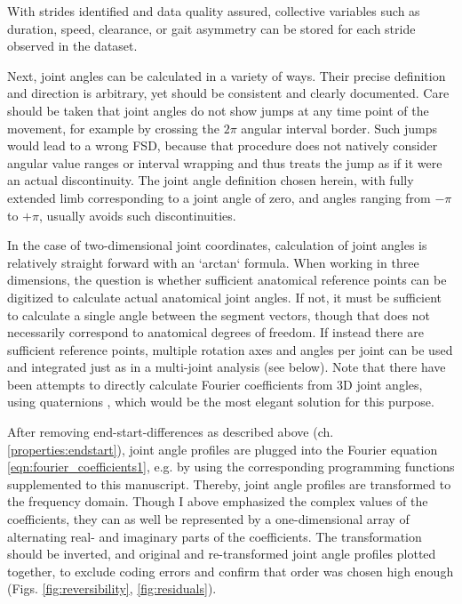 With strides identified and data quality assured, collective variables such as duration, speed, clearance, or gait asymmetry can be stored for each stride observed in the dataset.


Next, joint angles can be calculated in a variety of ways.
Their precise definition and direction is arbitrary, yet should be consistent and clearly documented.
Care should be taken that joint angles do not show jumps at any time point of the movement, for example by crossing the \(2\pi\) angular interval border.
Such jumps would lead to a wrong FSD, because that procedure does not natively consider angular value ranges or interval wrapping and thus treats the jump as if it were an actual discontinuity.
The joint angle definition chosen herein, with fully extended limb corresponding to a joint angle of zero, and angles ranging from \(-\pi\) to \(+\pi\), usually avoids such discontinuities.

In the case of two-dimensional joint coordinates, calculation of joint angles is relatively straight forward with an `arctan` formula.
When working in three dimensions, the question is whether sufficient anatomical reference points can be digitized to calculate actual anatomical joint angles.
If not, it must be sufficient to calculate a single angle between the segment vectors, though that does not necessarily correspond to anatomical degrees of freedom.
If instead there are sufficient reference points, multiple rotation axes and angles per joint can be used and integrated just as in a multi-joint analysis (see below).
Note that there have been attempts to directly calculate Fourier coefficients from 3D joint angles, using quaternions \citep{Kenwright2015}, which would be the most elegant solution for this purpose.


After removing end-start-differences as described above (ch. \ref{properties:endstart}), joint angle profiles are plugged into the Fourier equation \eqref{eqn:fourier_coefficients1}, e.g. by using the corresponding programming functions supplemented to this manuscript.
Thereby, joint angle profiles are transformed to the frequency domain.
Though I above emphasized the complex values of the coefficients, they can as well be represented by a one-dimensional array of alternating real- and imaginary parts of the coefficients.
The transformation should be inverted, and original and re-transformed joint angle profiles plotted together, to exclude coding errors and confirm that order was chosen high enough (Figs. \ref{fig:reversibility}, \ref{fig:residuals}).

